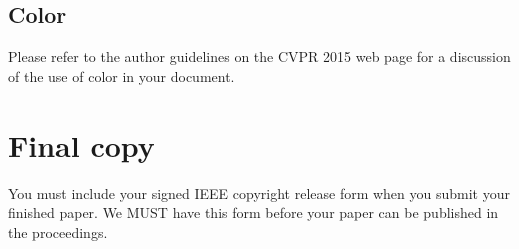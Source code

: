 \documentclass[10pt,twocolumn,letterpaper]{article}
\begin{document}
\subsection{Color}

Please refer to the author guidelines on the CVPR 2015 web page for a discussion
of the use of color in your document.

\section{Final copy}

You must include your signed IEEE copyright release form when you submit
your finished paper. We MUST have this form before your paper can be
published in the proceedings.
\end{document}
